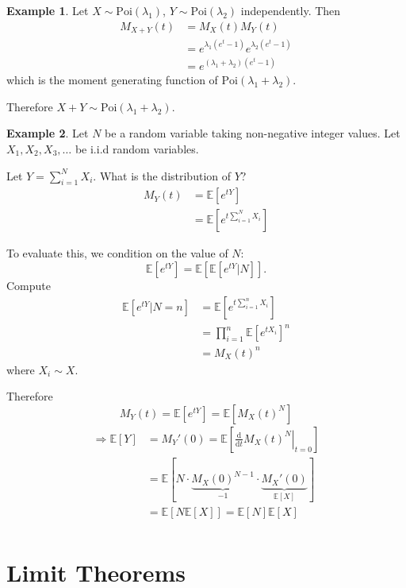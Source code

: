 \documentclass[a4paper,11pt]{amsbook}
\theoremstyle{definition}
\newtheorem{example}{\hspace{-2em} \color{darkblue} Example}[chapter]
\theoremstyle{remark}
\newcommand{\E}{\mathbb{E}}
\newcommand\0{\varnothing}
\newcommand\Poi{\text{Poi}}
\newcommand\diff[2][]
{
    \frac{\mathrm{d}#1}{\mathrm{d}#2}
}
\begin{document}
\begin{example}
    Let $X\sim\Poi(\lambda_1)$, $Y\sim\Poi(\lambda_2)$ independently. Then
    \begin{align*}
        M_{X+Y}(t)&=M_X(t)M_Y(t) \\
        &=e^{\lambda_1(e^t-1)}e^{\lambda_2(e^t-1)} \\
        &=e^{(\lambda_1+\lambda_2)(e^t-1)}
    \end{align*}
    which is the moment generating function of $\Poi(\lambda_1+\lambda_2)$.

    Therefore $X+Y\sim\Poi(\lambda_1+\lambda_2)$.
\end{example}

\begin{example}
    Let $N$ be a random variable taking non-negative integer values.
    Let $X_1,X_2,X_3,\ldots$ be i.i.d random variables. 

    Let $Y=\sum_{i=1}^NX_i$. What is the distribution of $Y$?
    \begin{align*}
        M_Y(t)&=\E[e^{tY}] \\
        &=\E\left[e^{t\sum_{i=1}^NX_i}\right]
    \end{align*}

    To evaluate this, we condition on the value of $N$:
    $$\E[e^{tY}]=\E\left[\E\left[e^{tY}|N\right]\right].$$
    Compute \begin{align*}
        \E\left[e^{tY}|N=n\right]&=\E\left[e^{t\sum_{i=1}^nX_i}\right] \\
        &=\prod_{i=1}^n\E\left[e^{tX_i}\right]^n \tag{independence} \\
        &=M_X(t)^n
    \end{align*}
    where $X_i\sim X$.

    Therefore $$M_Y(t)=\E[e^{tY}]=\E\left[M_X(t)^N\right]$$
        \begin{align*}
            \Rightarrow \E[Y]&=M_Y'(0)=\E\left[\left.\diff{t}M_X(t)^N\right|_{t=0}\right] \\
            &=\E[N\cdot \underbrace{M_X(0)^{N-1}}_{-1}\cdot\underbrace{M_X'(0)}_{\E[X]}] \\
            &=\E[N\E[X]]=\E[N]\E[X] \\
        \end{align*}
\end{example}

\chapter{Limit Theorems} \label{part::limit}
\end{document}
